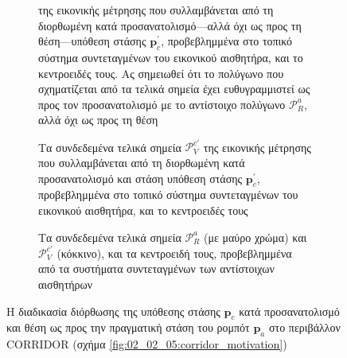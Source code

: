 \begin{figure}
\begin{subfigure}[t]{0.475\linewidth}
{                  της εικονικής μέτρησης που συλλαμβάνεται από τη διορθωμένη
                  κατά προσανατολισμό---αλλά όχι ως προς τη θέση---υπόθεση
                  στάσης $\bm{p}_c^\prime$, προβεβλημμένα στο τοπικό σύστημα
                  συντεταγμένων του εικονικού αισθητήρα, και το κεντροειδές
                  τους. Ας σημειωθεί ότι το πολύγωνο που σχηματίζεται από τα
                  τελικά σημεία έχει ευθυγραμμιστεί ως προς τον προσανατολισμό
                  με το αντίστοιχο πολύγωνο $\mathcal{P}_R^a$, αλλά όχι ως προς
                  τη θέση}
    \end{subfigure}
    \begin{subfigure}[t]{0.475\linewidth} \centering
        \hspace{0.5cm}
        \vspace{1em}
        \caption{\small Τα συνδεδεμένα τελικά σημεία $\mathcal{P}_V^{c\prime}$ της
                  εικονικής μέτρησης που συλλαμβάνεται από τη διορθωμένη
                  κατά προσανατολισμό και στάση υπόθεση στάσης
                  $\bm{p}_c^\prime$, προβεβλημμένα στο τοπικό σύστημα
                  συντεταγμένων του εικονικού αισθητήρα, και το κεντροειδές
                  τους}
    \end{subfigure}
    \hfill
    \begin{subfigure}[t]{0.475\linewidth} \centering
        \hspace{0.5cm}
        \vspace{1em}
        \caption{\small Τα συνδεδεμένα τελικά σημεία $\mathcal{P}_R^a$ (με
                 μαύρο χρώμα) και $\mathcal{P}_V^{c\prime}$ (κόκκινο), και τα
                 κεντροειδή τους, προβεβλημμένα από τα συστήματα συντεταγμένων
                 των αντίστοιχων αισθητήρων}
    \end{subfigure}
    \caption{\small Η διαδικασία διόρθωσης της υπόθεσης στάσης $\bm{p}_c$
             κατά προσανατολισμό και θέση ως προς την πραγματική στάση του
             ρομπότ $\bm{p}_a$ στο περιβάλλον CORRIDOR (σχήμα
             \ref{fig:02_02_05:corridor_motivation})}
    \label{fig:pgl_fmic_illustration}
\end{figure}

